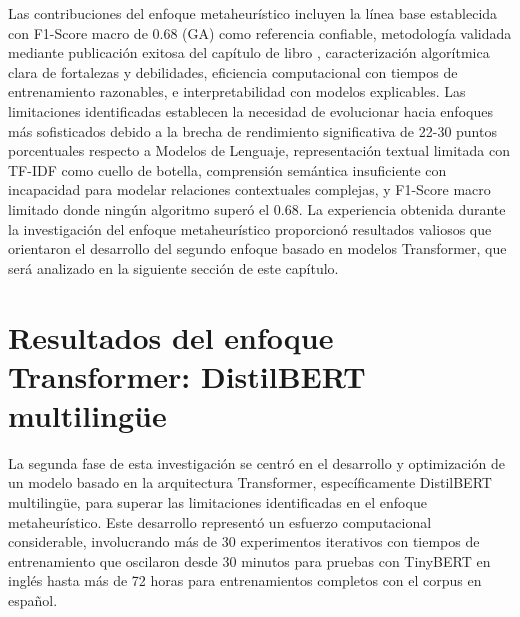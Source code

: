 \begin{table}[htbp]
\centering
{}
\caption{Comparación de rendimiento entre enfoques metaheurísticos y Modelos de Lenguaje usando métricas macro.}
\label{tab:comparacion_enfoques}
\end{table}

Las contribuciones del enfoque metaheurístico incluyen la línea base establecida con F1-Score macro de 0.68 (GA) como referencia confiable, metodología validada mediante publicación exitosa del capítulo de libro \cite{hurtado2024calibracion}, caracterización algorítmica clara de fortalezas y debilidades, eficiencia computacional con tiempos de entrenamiento razonables, e interpretabilidad con modelos explicables. Las limitaciones identificadas establecen la necesidad de evolucionar hacia enfoques más sofisticados debido a la brecha de rendimiento significativa de 22-30 puntos porcentuales respecto a Modelos de Lenguaje, representación textual limitada con TF-IDF como cuello de botella, comprensión semántica insuficiente con incapacidad para modelar relaciones contextuales complejas, y F1-Score macro limitado donde ningún algoritmo superó el 0.68. La experiencia obtenida durante la investigación del enfoque metaheurístico proporcionó resultados valiosos que orientaron el desarrollo del segundo enfoque basado en modelos Transformer, que será analizado en la siguiente sección de este capítulo.

\section{Resultados del enfoque Transformer: DistilBERT multilingüe}
\label{sec:resultados_distilbert}

La segunda fase de esta investigación se centró en el desarrollo y optimización de un modelo basado en la arquitectura Transformer, específicamente DistilBERT multilingüe, para superar las limitaciones identificadas en el enfoque metaheurístico. Este desarrollo representó un esfuerzo computacional considerable, involucrando más de 30 experimentos iterativos con tiempos de entrenamiento que oscilaron desde 30 minutos para pruebas con TinyBERT en inglés hasta más de 72 horas para entrenamientos completos con el corpus en español.

